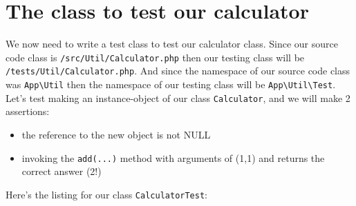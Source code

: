 \documentclass[a4paperpaper,openright]{book}
\begin{document}
\hypertarget{the-class-to-test-our-calculator}{%
\section{The class to test our
calculator}\label{the-class-to-test-our-calculator}}

We now need to write a test class to test our calculator class. Since
our source code class is \texttt{/src/Util/Calculator.php} then our
testing class will be \texttt{/tests/Util/Calculator.php}. And since the
namespace of our source code class was \texttt{App\textbackslash{}Util}
then the namespace of our testing class will be
\texttt{App\textbackslash{}Util\textbackslash{}Test}. Let's test making
an instance-object of our class \texttt{Calculator}, and we will make 2
assertions:

\begin{itemize}
\item
  the reference to the new object is not NULL
\item
  invoking the \texttt{add(...)} method with arguments of (1,1) and
  returns the correct answer (2!)
\end{itemize}

Here's the listing for our class \texttt{CalculatorTest}:
\end{document}
